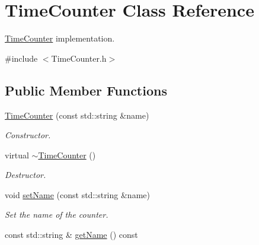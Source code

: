 \hypertarget{class_time_counter}{\section{Time\+Counter Class Reference}
\label{class_time_counter}
}


\hyperlink{class_time_counter}{Time\+Counter} implementation.  




{\ttfamily \#include $<$Time\+Counter.\+h$>$}

\subsection*{Public Member Functions}
\begin{DoxyCompactItemize}
\item 
\hypertarget{class_time_counter_a97c725f083ddea9e113b2af85d564995}{\hyperlink{class_time_counter_a97c725f083ddea9e113b2af85d564995}{Time\+Counter} (const std\+::string \&name)}\label{class_time_counter_a97c725f083ddea9e113b2af85d564995}

\begin{DoxyCompactList}\small\item\em Constructor. \end{DoxyCompactList}\item 
\hypertarget{class_time_counter_a29b72a1f27b48bda15e15dae2ce98a51}{virtual \hyperlink{class_time_counter_a29b72a1f27b48bda15e15dae2ce98a51}{$\sim$\+Time\+Counter} ()}\label{class_time_counter_a29b72a1f27b48bda15e15dae2ce98a51}

\begin{DoxyCompactList}\small\item\em Destructor. \end{DoxyCompactList}\item 
\hypertarget{class_time_counter_a32cb7d643afd5c748549900417a8eb60}{void \hyperlink{class_time_counter_a32cb7d643afd5c748549900417a8eb60}{set\+Name} (const std\+::string \&name)}\label{class_time_counter_a32cb7d643afd5c748549900417a8eb60}

\begin{DoxyCompactList}\small\item\em Set the name of the counter. \end{DoxyCompactList}\item 
\hypertarget{class_time_counter_acf8d1fd02676e6d8e3f44ceef8fce188}{const std\+::string \& \hyperlink{class_time_counter_acf8d1fd02676e6d8e3f44ceef8fce188}{get\+Name} () const }\label{class_time_counter_acf8d1fd02676e6d8e3f44ceef8fce188}


\end{DoxyCompactItemize}
